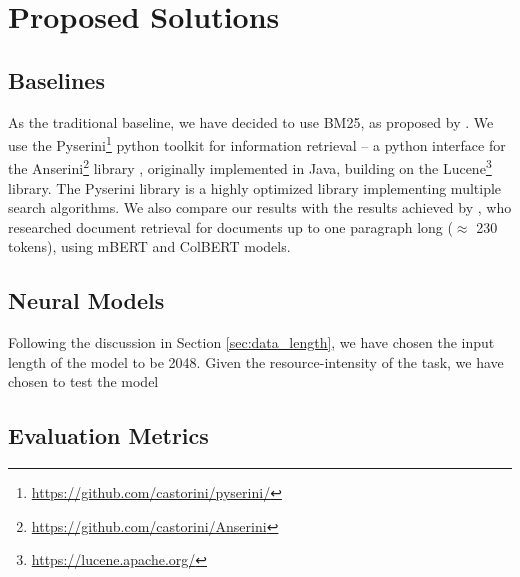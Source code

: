 \chapter{Proposed Solutions}

\section{Baselines}

As the traditional baseline, we have decided to use BM25, as proposed by \citet{weak-baselines}.
We use the Pyserini\footnote{\url{https://github.com/castorini/pyserini/}} python toolkit for information retrieval \citep{pyserini} -- a python interface for the Anserini\footnote{\url{https://github.com/castorini/Anserini}} library \citep{anserini1, anserini2}, originally implemented in Java, building on the Lucene\footnote{\url{https://lucene.apache.org/}} library.
The Pyserini library is a highly optimized library implementing multiple search algorithms.
We also compare our results with the results achieved by \citet{rypar}, who researched document retrieval for documents up to one paragraph long ($\approx$ 230 tokens), using mBERT and ColBERT \citep{colbert} models.

\section{Neural Models}

Following the discussion in Section \ref{sec:data_length}, we have chosen the input length of the model to be 2048. 
Given the resource-intensity of the task, we have chosen to test the \nystr{} model 

\section{Evaluation Metrics}

